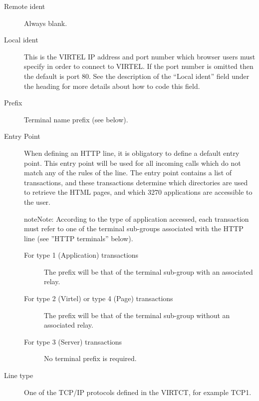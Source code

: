 \documentclass[letterpaper,10pt,english]{sphinxmanual}
\begin{document}
\begin{description}
\item[{Remote ident}] \leavevmode
Always blank.

\item[{Local ident}] \leavevmode
This is the VIRTEL IP address and port number which browser users must specify in order to connect to VIRTEL. If the port number is omitted then the default is port 80. See the description of the
“Local ident” field under the heading {\hyperref[\detokenize{connectivity_guide:bookmark13}]{}} for more details about how to code this field.

\item[{Prefix}] \leavevmode
Terminal name prefix (see below).

\item[{Entry Point}] \leavevmode
When defining an HTTP line, it is obligatory to define a default entry point. This entry point will be used for all incoming calls which do not match any of the rules of the line. The entry point contains a list of transactions, and these transactions determine which directories are used to retrieve the HTML pages, and which 3270 applications are accessible to the user.

\begin{sphinxadmonition}{note}{Note:}
According to the type of application accessed, each transaction must
refer to one of the terminal sub-groups associated with the HTTP
line (see ”HTTP terminals” below).
\end{sphinxadmonition}
\begin{description}
\item[{For type 1 (Application) transactions}] \leavevmode
The prefix will be that of the terminal sub-group with an associated relay.

\item[{For type 2 (Virtel) or type 4 (Page) transactions}] \leavevmode
The prefix will be that of the terminal sub-group without an associated relay.

\item[{For type 3 (Server) transactions}] \leavevmode
No terminal prefix is required.

\end{description}

\item[{Line type}] \leavevmode
One of the TCP/IP protocols defined in the VIRTCT, for example TCP1.


\end{description}
\end{document}
